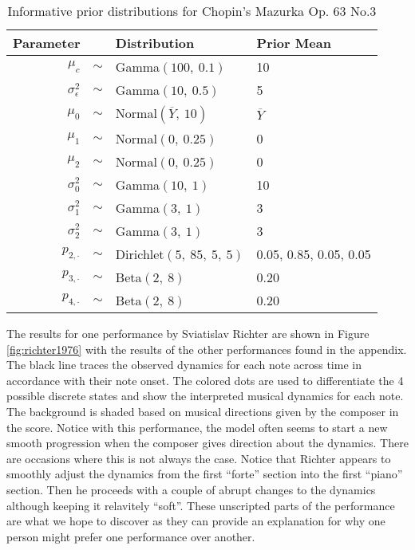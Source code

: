 \documentclass[12pt]{article}
\begin{document}
\begin{table}[t]
  \centering
  \begin{tabular}{@{}rcll@{}}
    \toprule
    Parameter & \phantom{a} & Distribution & Prior Mean \\
    \midrule
    $\mu_c$ & $\sim$ & Gamma$(100,\ 0.1)$ & 10\\
    $\sigma^2_{\epsilon}$ & $\sim$ & Gamma$(10,\ 0.5)$ & 5\\
    $\mu_{0}$ & $\sim$ & Normal$(\overline{Y},\ 10)$ & $\overline{Y}$\\
    $\mu_{1} $ & $\sim$ & Normal$(0,\ 0.25)$ & 0\\
    $\mu_{2} $ & $\sim$ & Normal$(0,\ 0.25)$ & 0\\
    $\sigma^2_{0} $ & $\sim$ & Gamma$(10,\ 1)$ & 10 \\
    $\sigma^2_{1} $ & $\sim$ & Gamma$(3,\ 1)$ & 3 \\
    $\sigma^2_{2} $ & $\sim$ & Gamma$(3,\ 1)$ & 3 \\
    $p_{2,\cdot}$ & $\sim$ & Dirichlet$(5,\ 85,\ 5,\ 5)$ & 0.05, 0.85, 0.05, 0.05 \\
    $p_{3,\cdot}$ & $\sim$ & Beta$(2,\ 8)$ & 0.20\\
    $p_{4,\cdot}$ & $\sim$ & Beta$(2,\ 8)$ & 0.20\\
    \bottomrule
  \end{tabular}
  \caption{Informative prior distributions for Chopin's Mazurka Op. 63 No.3}
  \label{tab:priors}
\end{table}

The results for one performance by Sviatislav Richter are shown in
Figure \ref{fig:richter1976} with the results of the other performances
found in the appendix. The black line traces the observed dynamics for
each note across time in accordance with their note onset. The colored
dots are used to differentiate the 4 possible discrete states and show
the interpreted musical dynamics for each note. The background is shaded
based on musical directions given by the composer in the score. Notice
with this performance, the model often seems to start a new smooth
progression when the composer gives direction about the dynamics. There
are occasions where this is not always the case. Notice that Richter
appears to smoothly adjust the dynamics from the first ``forte'' section
into the first ``piano'' section. Then he proceeds with a couple of
abrupt changes to the dynamics although keeping it relavitely ``soft''.
These unscripted parts of the performance are what we hope to discover
as they can provide an explanation for why one person might prefer one
performance over another.
\end{document}
